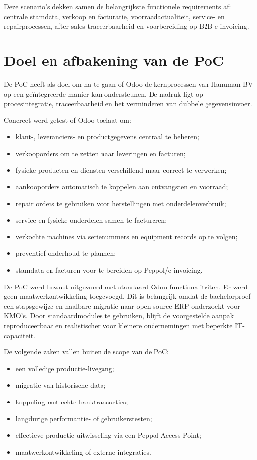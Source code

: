 Deze scenario's dekken samen de belangrijkste functionele requirements af: centrale stamdata, verkoop en facturatie, voorraadactualiteit, service- en repairprocessen, after-sales traceerbaarheid en voorbereiding op B2B-e-invoicing.

\section{Doel en afbakening van de PoC}
\label{sec:poc-doel}

De PoC heeft als doel om na te gaan of Odoo de kernprocessen van Hanuman BV op een geïntegreerde manier kan ondersteunen. De nadruk ligt op procesintegratie, traceerbaarheid en het verminderen van dubbele gegevensinvoer.

Concreet werd getest of Odoo toelaat om:

\begin{itemize}
    \item klant-, leveranciers- en productgegevens centraal te beheren;
    \item verkooporders om te zetten naar leveringen en facturen;
    \item fysieke producten en diensten verschillend maar correct te verwerken;
    \item aankooporders automatisch te koppelen aan ontvangsten en voorraad;
    \item repair orders te gebruiken voor herstellingen met onderdelenverbruik;
    \item service en fysieke onderdelen samen te factureren;
    \item verkochte machines via serienummers en equipment records op te volgen;
    \item preventief onderhoud te plannen;
    \item stamdata en facturen voor te bereiden op Peppol/e-invoicing.
\end{itemize}

De PoC werd bewust uitgevoerd met standaard Odoo-functionaliteiten. Er werd geen maatwerkontwikkeling toegevoegd. Dit is belangrijk omdat de bachelorproef een stapsgewijze en haalbare migratie naar open-source ERP onderzoekt voor KMO's. Door standaardmodules te gebruiken, blijft de voorgestelde aanpak reproduceerbaar en realistischer voor kleinere ondernemingen met beperkte IT-capaciteit.

De volgende zaken vallen buiten de scope van de PoC:

\begin{itemize}
    \item een volledige productie-livegang;
    \item migratie van historische data;
    \item koppeling met echte banktransacties;
    \item langdurige performantie- of gebruikerstesten;
    \item effectieve productie-uitwisseling via een Peppol Access Point;
    \item maatwerkontwikkeling of externe integraties.
\end{itemize}

